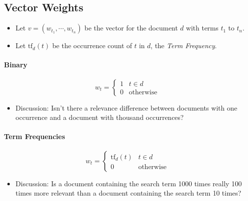         \subsection{Vector Weights} %
        	\begin{itemize}
        		\item Let \( v = (w_{t_1}, \cdots, w_{t_n}) \) be the vector for the document \( d \) with terms \( t_1 \) to \( t_n \).
        		\item Let \( \text{tf}_d(t) \) be the occurrence count of \(t\) in \(d\), the \textit{Term Frequency}.
        	\end{itemize}

            \paragraph{Binary} %
                \begin{equation*}
                    w_t =
                    	\begin{cases}
	                    	1 & t \in d \\
	                    	0 & \text{otherwise}
                    	\end{cases}
                \end{equation*}
                
                \begin{itemize}
                	\item Discussion: Isn't there a relevance difference between documents with one occurrence and a document with thousand occurrences?
                \end{itemize}

            \paragraph{Term Frequencies} %
                \begin{equation*}
                    w_t =
                    	\begin{cases}
	                    	\text{tf}_d(t) & t \in d \\
	                    	0 & \text{otherwise}
                    	\end{cases}
                \end{equation*}
                
                \begin{itemize}
                	\item Discussion: Is a document containing the search term 1000 times really 100 times more relevant than a document containing the search term 10 times?
                \end{itemize}

